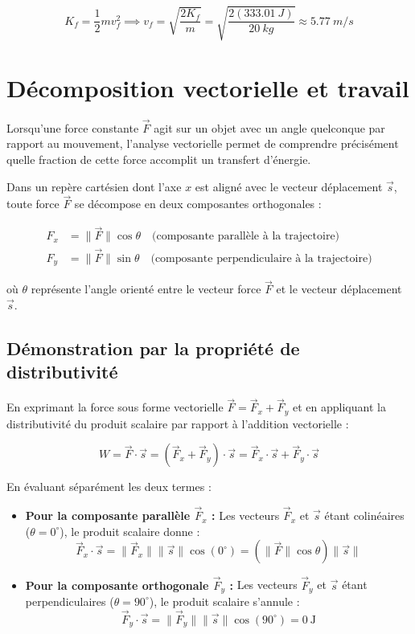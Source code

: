 \documentclass[11pt,openany]{book}
\begin{document}
\[
K_f = \frac{1}{2}m v_f^2 \implies v_f = \sqrt{\frac{2 K_f}{m}} = \sqrt{\frac{2(\SI{333.01}{J})}{\SI{20}{kg}}} \approx \SI{5.77}{m/s}
\]

\section{Décomposition vectorielle et travail}

Lorsqu'une force constante $\vec{F}$ agit sur un objet avec un angle quelconque par rapport au mouvement, l'analyse vectorielle permet de comprendre précisément quelle fraction de cette force accomplit un transfert d'énergie.

Dans un repère cartésien dont l'axe $x$ est aligné avec le vecteur déplacement $\vec{s}$, toute force $\vec{F}$ se décompose en deux composantes orthogonales :

\begin{align*}
F_x &= \|\vec{F}\| \cos\theta \quad \text{(composante parallèle à la trajectoire)} \\
F_y &= \|\vec{F}\| \sin\theta \quad \text{(composante perpendiculaire à la trajectoire)}
\end{align*}

où $\theta$ représente l'angle orienté entre le vecteur force $\vec{F}$ et le vecteur déplacement $\vec{s}$.

\subsection*{Démonstration par la propriété de distributivité}

En exprimant la force sous forme vectorielle $\vec{F} = \vec{F}_x + \vec{F}_y$ et en appliquant la distributivité du produit scalaire par rapport à l'addition vectorielle :

\[
W = \vec{F} \cdot \vec{s} = (\vec{F}_x + \vec{F}_y) \cdot \vec{s} = \vec{F}_x \cdot \vec{s} + \vec{F}_y \cdot \vec{s}
\]

En évaluant séparément les deux termes :
\begin{itemize}
    \item \textbf{Pour la composante parallèle $\vec{F}_x$ :} Les vecteurs $\vec{F}_x$ et $\vec{s}$ étant colinéaires ($\theta = 0^\circ$), le produit scalaire donne :
    \[
    \vec{F}_x \cdot \vec{s} = \|\vec{F}_x\| \|\vec{s}\| \cos(0^\circ) = (\|\vec{F}\| \cos\theta) \|\vec{s}\|
    \]
    
    \item \textbf{Pour la composante orthogonale $\vec{F}_y$ :} Les vecteurs $\vec{F}_y$ et $\vec{s}$ étant perpendiculaires ($\theta = 90^\circ$), le produit scalaire s'annule :
    \[
    \vec{F}_y \cdot \vec{s} = \|\vec{F}_y\| \|\vec{s}\| \cos(90^\circ) = 0\ \mathrm{J}
    \]
\end{itemize}
\end{document}
